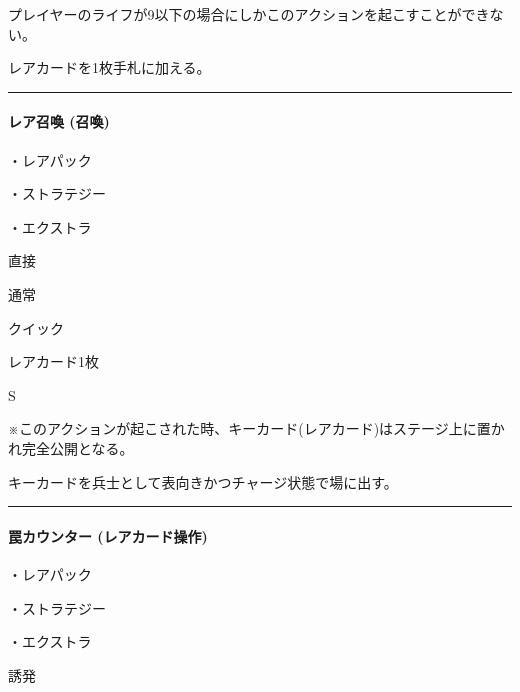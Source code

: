 \documentclass[letterpaper,10pt,dvipdfmx]{sphinxmanual}
\begin{document}
\sphinxAtStartPar
プレイヤーのライフが9以下の場合にしかこのアクションを起こすことができない。

\sphinxAtStartPar
{}

\sphinxAtStartPar
レアカードを1枚手札に加える。


\bigskip\hrule\bigskip



\paragraph{レア召喚 (召喚)}
\label{\detokenize{auto/frameActionlist:act-summonsrare}}\label{\detokenize{auto/frameActionlist:id7}}
\sphinxAtStartPar
{}

\sphinxAtStartPar
・レアパック

\sphinxAtStartPar
・ストラテジー

\sphinxAtStartPar
・エクストラ

\sphinxAtStartPar
{} 直接

\sphinxAtStartPar
{} 通常

\sphinxAtStartPar
{} クイック

\sphinxAtStartPar
{} レアカード1枚

\sphinxAtStartPar
{} S

\sphinxAtStartPar
{} ※このアクションが起こされた時、キーカード(レアカード)はステージ上に置かれ完全公開となる。

\sphinxAtStartPar
{}

\sphinxAtStartPar
キーカードを兵士として表向きかつチャージ状態で場に出す。


\bigskip\hrule\bigskip



\paragraph{罠カウンター (レアカード操作)}
\label{\detokenize{auto/frameActionlist:act-trapcounter}}\label{\detokenize{auto/frameActionlist:id8}}
\sphinxAtStartPar
{}

\sphinxAtStartPar
・レアパック

\sphinxAtStartPar
・ストラテジー

\sphinxAtStartPar
・エクストラ

\sphinxAtStartPar
{} 誘発
\end{document}
